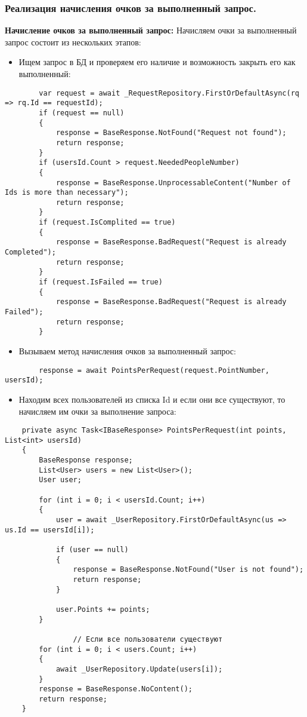 \subsubsection{Реализация начисления очков за выполненный запрос.}

\textbf{Начисление очков за выполненный запрос:} Начисляем очки за выполненный запрос состоит из нескольких этапов:

\begin{itemize}
	\item{Ищем запрос в БД и проверяем его наличие и возможность закрыть его как выполненный:}
\end{itemize}
\begin{verbatim}
        var request = await _RequestRepository.FirstOrDefaultAsync(rq => rq.Id == requestId);
        if (request == null)
        {
            response = BaseResponse.NotFound("Request not found");
            return response;
        }
        if (usersId.Count > request.NeededPeopleNumber)
        {
            response = BaseResponse.UnprocessableContent("Number of Ids is more than necessary");
            return response;
        }
        if (request.IsComplited == true)
        {
            response = BaseResponse.BadRequest("Request is already Completed");
            return response;
        }
        if (request.IsFailed == true)
        {
            response = BaseResponse.BadRequest("Request is already Failed");
            return response;
        }
\end{verbatim}
\begin{itemize}
	\item{Вызываем метод начисления очков за выполненный запрос:}
\end{itemize}
\begin{verbatim}
        response = await PointsPerRequest(request.PointNumber, usersId);
\end{verbatim}

\begin{itemize}
	\item{Находим всех пользователей из списка Id и если они все существуют, то начисляем им очки за выполнение запроса:}
\end{itemize}
\begin{verbatim}
    private async Task<IBaseResponse> PointsPerRequest(int points, List<int> usersId)
    {
        BaseResponse response;
        List<User> users = new List<User>();
        User user;

        for (int i = 0; i < usersId.Count; i++)
        {
            user = await _UserRepository.FirstOrDefaultAsync(us => us.Id == usersId[i]);

            if (user == null)
            {
                response = BaseResponse.NotFound("User is not found");
                return response;
            }

            user.Points += points;
        }

				// Если все пользователи существуют
        for (int i = 0; i < users.Count; i++)
        {
            await _UserRepository.Update(users[i]);
        }
        response = BaseResponse.NoContent();
        return response;
    }
\end{verbatim}

